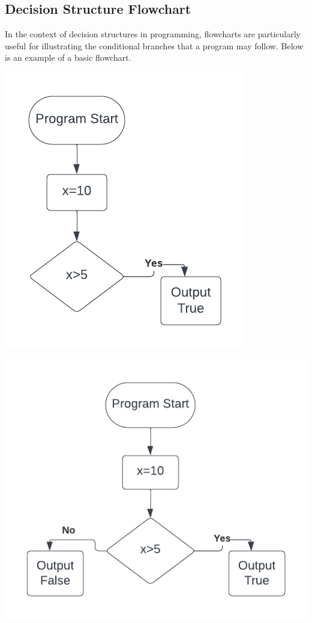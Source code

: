 \documentclass{report}
\begin{document}
    \subsection{Decision Structure Flowchart}
    \bigbreak \noindent 
    In the context of decision structures in programming, flowcharts are particularly useful for illustrating the conditional branches that a program may follow. Below is an example of a basic flowchart.
    \bigbreak \noindent 
    \begin{minipage}[]{0.3\textwidth}
        \begin{center}
            \includegraphics[scale=0.6]{./figures/flowchart1.png}
        \end{center}
    \end{minipage}
    \begin{minipage}[]{0.3\textwidth}
        \begin{center}
            \includegraphics[scale=0.6]{./figures/flowchart2.png}
        \end{center} 
    \end{minipage}
\end{document}
